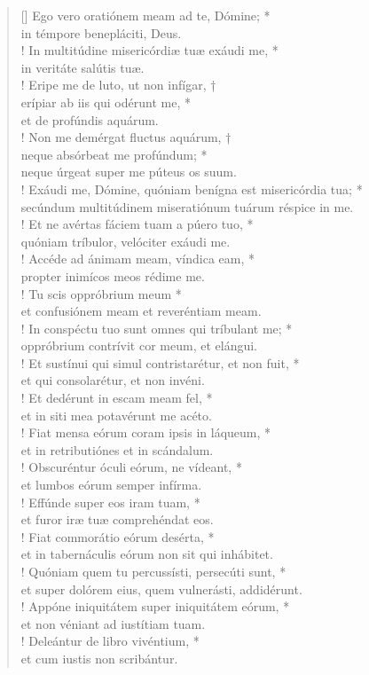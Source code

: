 \begin{verse}[\versewidth]
Ego vero oratiónem meam ad te, Dómine; *\\
in témpore benepláciti, Deus.\\!
\vin In multitúdine misericórdiæ tuæ exáudi me, *\\
\vin in veritáte salútis tuæ.\\!
Eripe me de luto, ut non infígar, †\\
erípiar ab iis qui odérunt me, *\\
et de profúndis aquárum.\\!
\vin Non me demérgat fluctus aquárum, †\\
\vin neque absórbeat me profúndum; *\\
\vin neque úrgeat super me púteus os suum.\\!
Exáudi me, Dómine, quóniam benígna est misericórdia tua; *\\
secúndum multitúdinem miseratiónum tuárum réspice in me.\\!
\vin Et ne avértas fáciem tuam a púero tuo, *\\
\vin quóniam tríbulor, velóciter exáudi me.\\!
Accéde ad ánimam meam, víndica eam, *\\
propter inimícos meos rédime me.\\!
\vin Tu scis oppróbrium meum *\\
\vin et confusiónem meam et reveréntiam meam.\\!
In conspéctu tuo sunt omnes qui tríbulant me; *\\
oppróbrium contrívit cor meum, et elángui.\\!
\vin Et sustínui qui simul contristarétur, et non fuit, *\\
\vin et qui consolarétur, et non invéni.\\!
Et dedérunt in escam meam fel, *\\
et in siti mea potavérunt me acéto.\\!
\vin Fiat mensa eórum coram ipsis in láqueum, *\\
\vin et in retributiónes et in scándalum.\\!
Obscuréntur óculi eórum, ne vídeant, *\\
et lumbos eórum semper infírma.\\!
\vin Effúnde super eos iram tuam, *\\
\vin et furor iræ tuæ comprehéndat eos.\\!
Fiat commorátio eórum desérta, *\\
et in tabernáculis eórum non sit qui inhábitet.\\!
\vin Quóniam quem tu percussísti, persecúti sunt, *\\
\vin et super dolórem eius, quem vulnerásti, addidérunt.\\!
Appóne iniquitátem super iniquitátem eórum, *\\
et non véniant ad iustítiam tuam.\\!
\vin Deleántur de libro vivéntium, *\\
\vin et cum iustis non scribántur.\\
\end{verse}
